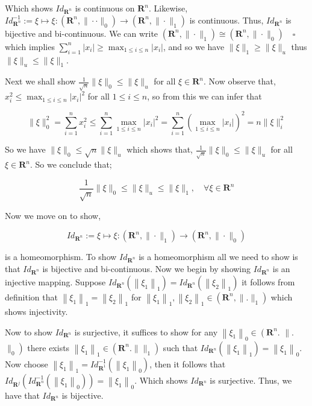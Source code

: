 \documentclass{article}
\begin{document}
Which shows $I d_{\mathbf{R}^{n}}$ is continuous on $\mathbf{R}^{n}$. Likewise, $I d_{\mathbf{R}^{n}}^{-1}:=\xi \mapsto \xi:\left(\mathbf{R}^{n},\|\cdot \cdot\|_{0}\right) \rightarrow\left(\mathbf{R}^{n},\|\cdot\|_{1}\right)$ is continuous. Thus, $I d_{\mathbf{R}^{n}}$ is bijective and bi-continuous. We can write $\left(\mathbf{R}^{n},\|\cdot\|_{1}\right) \cong\left(\mathbf{R}^{n},\|\cdot\|_{0}\right) \quad \square$
which implies $\sum_{i=1}^{n}\left|x_{i}\right| \geq \max _{1 \leq i \leq n}\left|x_{i}\right|$, and so we have $\|\xi\|_{1} \geq\|\xi\|_{u}$ thus $\|\xi\|_{u} \leq\|\xi\|_{1}$.

Next we shall show $\frac{1}{\sqrt{n}}\|\xi\|_{0} \leq\|\xi\|_{u}$ for all $\xi \in \mathbf{R}^{n}$. Now observe that, $x_{i}^{2} \leq \max _{1 \leq i \leq n}\left|x_{i}\right|^{2}$ for all $1 \leq i \leq n$, so from this we can infer that

$$
\|\xi\|_{0}^{2}=\sum_{i=1}^{n} x_{i}^{2} \leq \sum_{i=1}^{n} \max _{1 \leq i \leq n}\left|x_{i}\right|^{2}=\sum_{i=1}^{n}\left(\max _{1 \leq i \leq n}\left|x_{i}\right|\right)^{2}=n\|\xi\|_{i}^{2}
$$

So we have $\|\xi\|_{0} \leq \sqrt{n}\|\xi\|_{u}$ which shows that, $\frac{1}{\sqrt{n}}\|\xi\|_{0} \leq\|\xi\|_{u}$ for all $\xi \in \mathbf{R}^{n}$. So we conclude that;

$$
\frac{1}{\sqrt{n}}\|\xi\|_{0} \leq\|\xi\|_{u} \leq\|\xi\|_{1}, \quad \forall \xi \in \mathbf{R}^{n}
$$

Now we move on to show,

$$
I d_{\mathbf{R}^{n}}:=\xi \mapsto \xi:\left(\mathbf{R}^{n},\|\cdot\|_{1}\right) \longrightarrow\left(\mathbf{R}^{n},\|\cdot\|_{0}\right)
$$

is a homeomorphism. To show $I d_{\mathbf{R}^{n}}$ is a homeomorphism all we need to show is that $I d_{\mathbf{R}^{n}}$ is bijective and bi-continuous. Now we begin by showing $I d_{\mathbf{R}^{n}}$ is an injective mapping. Suppose $I d_{\mathbf{R}^{n}}\left(\left\|\xi_{1}\right\|_{1}\right)=I d_{\mathbf{R}^{n}}\left(\left\|\xi_{2}\right\|_{1}\right)$ it follows from definition that $\left\|\xi_{1}\right\|_{1}=\left\|\xi_{2}\right\|_{1}$ for $\left\|\xi_{1}\right\|_{1},\left\|\xi_{2}\right\|_{1} \in\left(\mathbf{R}^{n},\|.\|_{1}\right)$ which shows injectivity.

Now to show $I d_{\mathbf{R}^{n}}$ is surjective, it suffices to show for any $\left\|\xi_{1}\right\|_{0} \in\left(\mathbf{R}^{n}\right.$. $\|$. $\left.\|_{0}\right)$ there exists $\left\|\xi_{1}\right\|_{1} \in\left(\mathbf{R}^{n} .\|\|_{1}\right)$ such that $I d_{\mathbf{R}^{n}}\left(\left\|\xi_{1}\right\|_{1}\right)=\left\|\xi_{1}\right\|_{0}$. Now choose $\left\|\xi_{1}\right\|_{1}=I d_{\mathbf{R}^{1}}^{-1}\left(\left\|\xi_{1}\right\|_{0}\right)$, then it follows that $I d_{\mathbf{R}^{j}}\left(I d_{\mathbf{R}^{n}}^{-1}\left(\left\|\xi_{1}\right\|_{0}\right)\right)=\left\|\xi_{1}\right\|_{0}$. Which shows $I d_{\mathbf{R}^{n}}$ is surjective. Thus, we have that $I d_{\mathbf{R}^{n}}$ is bijective.
\end{document}
